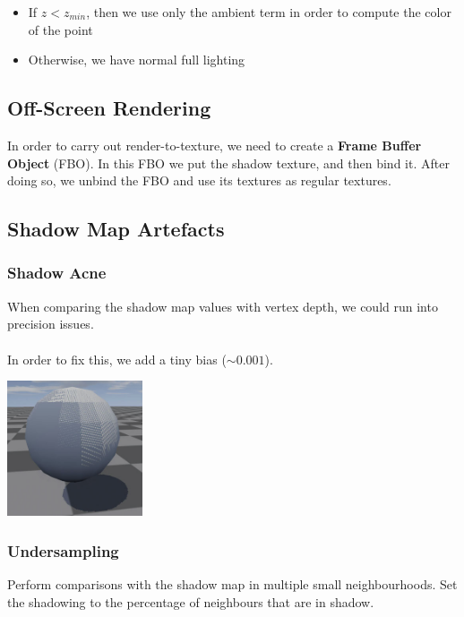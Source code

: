 \documentclass{article}
\begin{document}
\begin{itemize}
	\item If $z < z_{min}$, then we use only the ambient term in order to compute the color of the point
	\item Otherwise, we have normal full lighting
\end{itemize}

\subsection{Off-Screen Rendering}
In order to carry out render-to-texture, we need to create a \textbf{Frame Buffer Object} (FBO). In this FBO we put the shadow texture, and then bind it. After doing so, we unbind the FBO and use its textures as regular textures.

\subsection{Shadow Map Artefacts}
\subsubsection{Shadow Acne}
When comparing the shadow map values with vertex depth, we could run into precision issues. \\ \\
In order to fix this, we add a tiny bias ($\sim 0.001$).\\

\begin{center}
	\includegraphics[width=4cm]{shadow_acne.png}
\end{center}

\subsubsection{Undersampling}
Perform comparisons with the shadow map in multiple small neighbourhoods. Set the shadowing to the percentage of neighbours that are in shadow.
\end{document}
